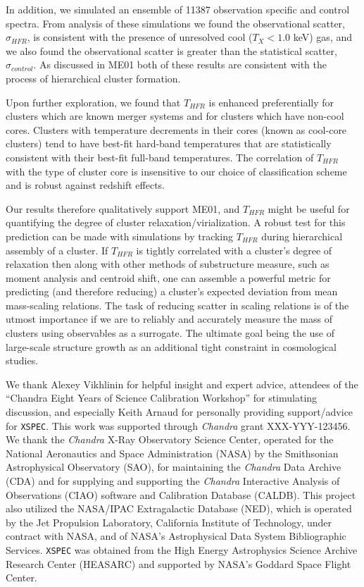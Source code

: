 \documentclass{emulateapj}
\begin{document}
In addition, we simulated an ensemble of 11387 observation
specific and control spectra. From analysis of these simulations we
found the observational scatter, $\sigma_{HFR}$, is consistent with
the presence of unresolved cool ($T_X < 1.0$ keV) gas, and we also
found the observational scatter is greater than the statistical
scatter, $\sigma_{control}$. As discussed in ME01 both of these
results are consistent with the process of hierarchical cluster
formation.

Upon further exploration, we found that $T_{HFR}$ is enhanced
preferentially for clusters which are known merger systems and for
clusters which have non-cool cores. Clusters with temperature decrements in
their cores (known as cool-core clusters) tend to have best-fit
hard-band temperatures that are statistically consistent with their
best-fit full-band temperatures. The correlation of $T_{HFR}$ with
the type of cluster core is insensitive to our choice of
classification scheme and is robust against redshift effects.

Our results therefore qualitatively support ME01, and $T_{HFR}$ might be
useful for quantifying the degree of cluster relaxation/virialization.
A robust test for this prediction can be made with simulations by
tracking $T_{HFR}$ during hierarchical assembly of a cluster. If $T_{HFR}$ is
tightly correlated with a cluster's degree of relaxation then along
with other methods of substructure measure, such as moment analysis
and centroid shift, one can assemble a powerful metric for predicting
(and therefore reducing) a cluster's expected deviation from mean
mass-scaling relations. The task of reducing scatter in scaling
relations is of the utmost importance if we are to reliably and
accurately measure the mass of clusters using observables as a
surrogate. The ultimate goal being the use of large-scale
structure growth as an additional tight constraint in cosmological
studies.


\acknowledgements
We thank Alexey Vikhlinin for helpful insight and expert advice,
attendees of the ``Chandra Eight Years of Science Calibration Workshop''
for stimulating discussion, and especially Keith Arnaud for
personally providing support/advice for {\tt XSPEC}. This work was
supported through {\it Chandra} grant XXX-YYY-123456. We thank the {\it Chandra} X-Ray
Observatory Science Center, operated for the National Aeronautics and
Space Administration (NASA) by the Smithsonian Astrophysical
Observatory (SAO), for maintaining the {\it Chandra} Data Archive (CDA) and
for supplying and supporting the {\it Chandra} Interactive Analysis of
Observations (CIAO) software and Calibration Database (CALDB). This
project also utilized the NASA/IPAC Extragalactic Database (NED),
which is operated by the Jet Propulsion Laboratory, California
Institute of Technology, under contract with NASA, and of NASA's
Astrophysical Data System Bibliographic Services. {\tt XSPEC} was
obtained from the High Energy Astrophysics Science Archive Research
Center (HEASARC) and supported by NASA's Goddard Space Flight Center.
\end{document}
